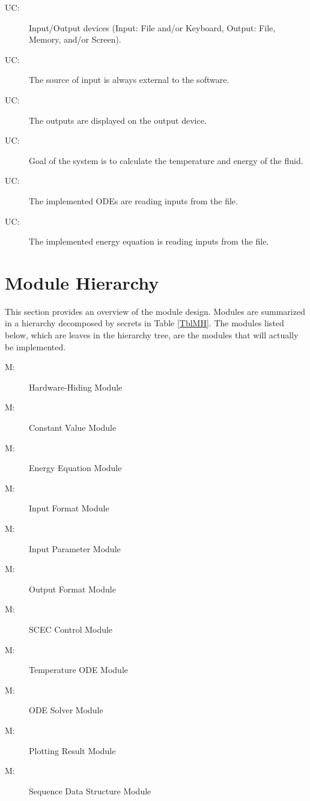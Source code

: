 \documentclass[12pt, titlepage]{article}
\newcounter{ucnum}
\newcommand{\uctheucnum}{UC\theucnum}
\newcounter{mnum}
\newcommand{\mthemnum}{M\themnum}
\begin{document}
\begin{description}
\item[ \uctheucnum \label{ucIO_1}:] Input/Output devices
  (Input: File and/or Keyboard, Output: File, Memory, and/or Screen).
\item[ \uctheucnum \label{ucInput_2}:] The source of input is always external to the software. 
\item[ \uctheucnum \label{ucOutput_3}:] The outputs are displayed on the output device. 
\item[ \uctheucnum \label{ucGoal_4}:] Goal of the system is to calculate the temperature and energy of the fluid.
\item[ \uctheucnum \label{ucOde_6}:] The implemented ODEs are reading inputs from the file. 
\item[ \uctheucnum \label{ucEnergy_7}:] The implemented energy equation is reading inputs from the file.  

\end{description}

\section{Module Hierarchy} \label{SecMH}

This section provides an overview of the module design. Modules are summarized
in a hierarchy decomposed by secrets in Table \ref{TblMH}. The modules listed
below, which are leaves in the hierarchy tree, are the modules that will
actually be implemented.

\begin{description}
\item [ \mthemnum \label{1_mHH}:] Hardware-Hiding Module
\item [ \mthemnum \label{2_mHH}:] Constant Value Module
\item [ \mthemnum \label{3_mHH}:] Energy Equation Module
\item [ \mthemnum \label{4_mHH}:] Input Format Module
\item [ \mthemnum \label{5_mHH}:] Input Parameter Module
\item [ \mthemnum \label{6_mHH}:] Output Format Module
\item [ \mthemnum \label{7_mHH}:] SCEC Control Module
\item [ \mthemnum \label{8_mHH}:] Temperature ODE Module
\item [ \mthemnum \label{9_mHH}:] ODE Solver Module
\item [ \mthemnum \label{10_mHH}:] Plotting Result Module
\item [ \mthemnum \label{12_mHH}:] Sequence Data Structure Module 

\end{description}
\end{document}
